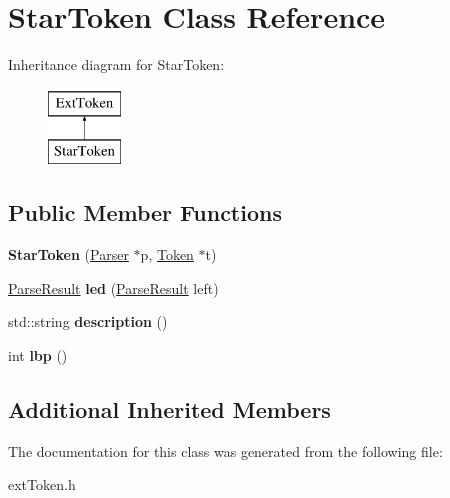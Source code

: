 \hypertarget{classStarToken}{\section{Star\-Token Class Reference}
\label{classStarToken}
}
Inheritance diagram for Star\-Token\-:\begin{figure}[H]
\begin{center}
\leavevmode
\includegraphics[height=2.000000cm]{classStarToken}
\end{center}
\end{figure}
\subsection*{Public Member Functions}
\begin{DoxyCompactItemize}
\item 
\hypertarget{classStarToken_a9e448a924eb2adbfde602c0590268afd}{{\bfseries Star\-Token} (\hyperlink{classParser}{Parser} $\ast$p, \hyperlink{classToken}{Token} $\ast$t)}\label{classStarToken_a9e448a924eb2adbfde602c0590268afd}

\item 
\hypertarget{classStarToken_aba82bdc81500a58096bfeedad600ad10}{\hyperlink{classParseResult}{Parse\-Result} {\bfseries led} (\hyperlink{classParseResult}{Parse\-Result} left)}\label{classStarToken_aba82bdc81500a58096bfeedad600ad10}

\item 
\hypertarget{classStarToken_a59b81cb08057d75eca4b9a8aad8e2be1}{std\-::string {\bfseries description} ()}\label{classStarToken_a59b81cb08057d75eca4b9a8aad8e2be1}

\item 
\hypertarget{classStarToken_a87682a46d434781795d060e43e7eae23}{int {\bfseries lbp} ()}\label{classStarToken_a87682a46d434781795d060e43e7eae23}

\end{DoxyCompactItemize}
\subsection*{Additional Inherited Members}


The documentation for this class was generated from the following file\-:\begin{DoxyCompactItemize}
\item 
ext\-Token.\-h\end{DoxyCompactItemize}
